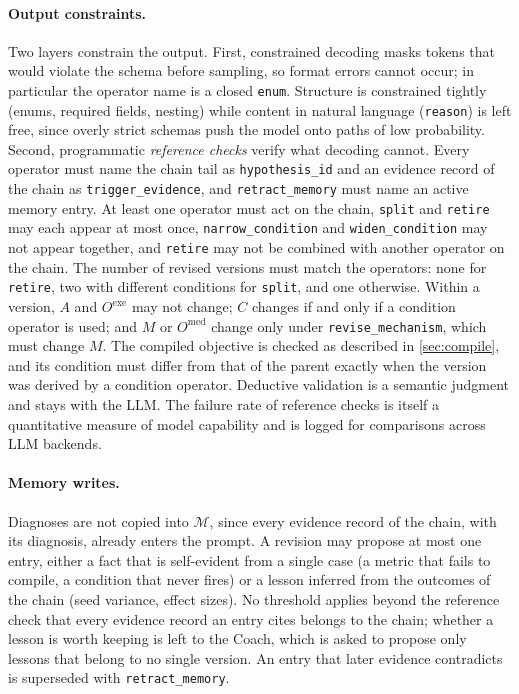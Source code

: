 \documentclass[11pt]{article}
\newcommand{\Mst}{\mathcal{M}}           %
\newcommand{\code}[1]{\texttt{\small #1}}
\begin{document}
\paragraph{Output constraints.}
Two layers constrain the output.
First, constrained decoding masks tokens that would violate the schema before sampling, so format errors cannot occur; in particular the operator name is a closed \code{enum}.
Structure is constrained tightly (enums, required fields, nesting) while content in natural language (\code{reason}) is left free, since overly strict schemas push the model onto paths of low probability.
Second, programmatic \emph{reference checks} verify what decoding cannot.
Every operator must name the chain tail as \code{hypothesis\_id} and an evidence record of the chain as \code{trigger\_evidence}, and \code{retract\_memory} must name an active memory entry.
At least one operator must act on the chain, \code{split} and \code{retire} may each appear at most once, \code{narrow\_condition} and \code{widen\_condition} may not appear together, and \code{retire} may not be combined with another operator on the chain.
The number of revised versions must match the operators: none for \code{retire}, two with different conditions for \code{split}, and one otherwise.
Within a version, $A$ and $O^{\mathrm{exe}}$ may not change; $C$ changes if and only if a condition operator is used; and $M$ or $O^{\mathrm{med}}$ change only under \code{revise\_mechanism}, which must change $M$.
The compiled objective is checked as described in \cref{sec:compile}, and its condition must differ from that of the parent exactly when the version was derived by a condition operator.
Deductive validation is a semantic judgment and stays with the LLM.
The failure rate of reference checks is itself a quantitative measure of model capability and is logged for comparisons across LLM backends.

\paragraph{Memory writes.}
Diagnoses are not copied into $\Mst$, since every evidence record of the chain, with its diagnosis, already enters the prompt.
A revision may propose at most one entry, either a fact that is self-evident from a single case (a metric that fails to compile, a condition that never fires) or a lesson inferred from the outcomes of the chain (seed variance, effect sizes).
No threshold applies beyond the reference check that every evidence record an entry cites belongs to the chain; whether a lesson is worth keeping is left to the Coach, which is asked to propose only lessons that belong to no single version.
An entry that later evidence contradicts is superseded with \code{retract\_memory}.
\end{document}
